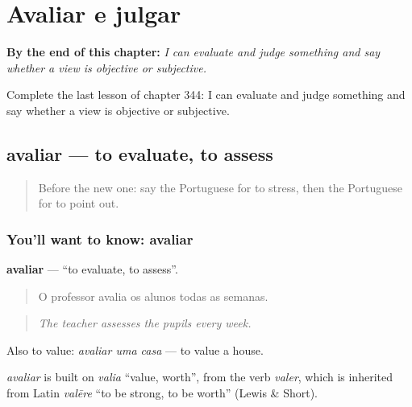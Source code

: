 
\chapter{Avaliar e julgar}
\label{ch:pt-avaliar-e-julgar}

\begin{chapteropening}
\textbf{By the end of this chapter:} \emph{I can evaluate and judge something and say whether a view is objective or subjective.}

Complete the last lesson of chapter 344: I can evaluate and judge something and say whether a view is objective or subjective.
\end{chapteropening}

\section[avaliar]{avaliar — to evaluate, to assess}

\label{lesson:PT-C344-avaliar}



\begin{quote}
Before the new one: say the Portuguese for to stress, then the Portuguese for to point out.
\end{quote}

\subsection*{You'll want to know: avaliar}
\textbf{avaliar} — \textquotedblleft{}to evaluate, to assess\textquotedblright{}.

\begin{quote}
O professor avalia os alunos todas as semanas.
\end{quote}

\begin{quote}
\emph{The teacher assesses the pupils every week.}
\end{quote}

Also to value: \emph{avaliar uma casa} — to value a house.

\begin{cousinweb}
\emph{avaliar} is built on \emph{valia} \textquotedblleft{}value, worth\textquotedblright{}, from the verb \emph{valer}, which is inherited from Latin \emph{valēre} \textquotedblleft{}to be strong, to be worth\textquotedblright{} (Lewis \& Short).
\end{cousinweb}

